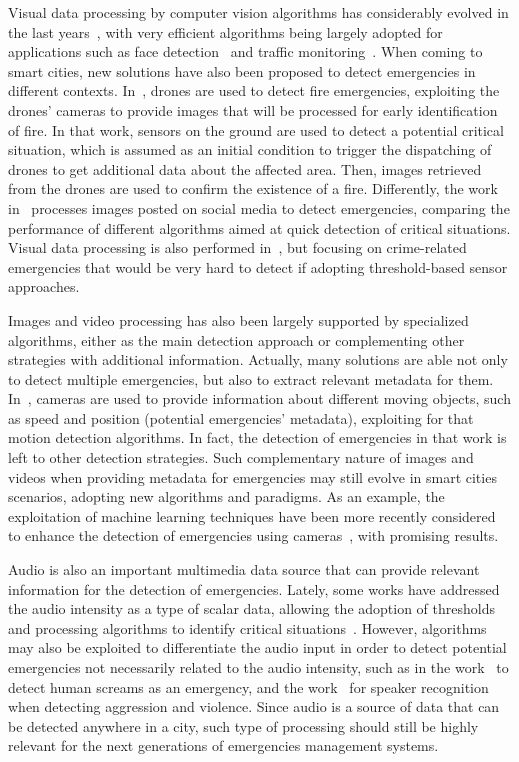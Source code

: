 \begin{refsection}
Visual data processing by computer vision algorithms has considerably evolved in the last years~\cite{computerVision1}, with very efficient algorithms being largely adopted for applications such as face detection~\cite{facerecognition} and traffic monitoring~\cite{camerastraffic}. When coming to smart cities, new solutions have also been proposed to detect emergencies in different contexts. In~\cite{visualdataEmergency1}, drones are used to detect fire emergencies, exploiting the drones' cameras to provide images that will be processed for early identification of fire. In that work, sensors on the ground are used to detect a potential critical situation, which is assumed as an initial condition to trigger the dispatching of drones to get additional data about the affected area. Then, images retrieved from the drones are used to confirm the existence of a fire. Differently, the work in~\cite{visualdataEmergency2} processes images posted on social media to detect emergencies, comparing the performance of different algorithms aimed at quick detection of critical situations. Visual data processing is also performed in~\cite{visualdataEmergency4}, but focusing on crime-related emergencies that would be very hard to detect if adopting threshold-based sensor approaches.

Images and video processing has also been largely supported by specialized algorithms, either as the main detection approach or complementing other strategies with additional information. Actually, many solutions are able not only to detect multiple emergencies, but also to extract relevant metadata for them. In~\cite{visualdataEmergency2}, cameras are used to provide information about different moving objects, such as speed and position (potential emergencies' metadata), exploiting for that motion detection algorithms. In fact, the detection of emergencies in that work is left to other detection strategies. Such complementary nature of images and videos when providing metadata for emergencies may still evolve in smart cities scenarios, adopting new algorithms and paradigms. As an example, the exploitation of machine learning techniques have been more recently considered to enhance the detection of emergencies using cameras~\cite{emergenciesmetric3}, with promising results. 

Audio is also an important multimedia data source that can provide relevant information for the detection of emergencies. Lately, some works have addressed the audio intensity as a type of scalar data, allowing the adoption of thresholds and processing algorithms to identify critical situations~\cite{iotAudio1,iotAudio2}. However, algorithms may also be exploited to differentiate the audio input in order to detect potential emergencies not necessarily related to the audio intensity, such as in the work~\cite{iotAudio3} to detect human screams as an emergency, and the work~\cite{iotAudio4} for speaker recognition when detecting aggression and violence. Since audio is a source of data that can be detected anywhere in a city, such type of processing should still be highly relevant for the next generations of emergencies management systems.


\end{refsection}
